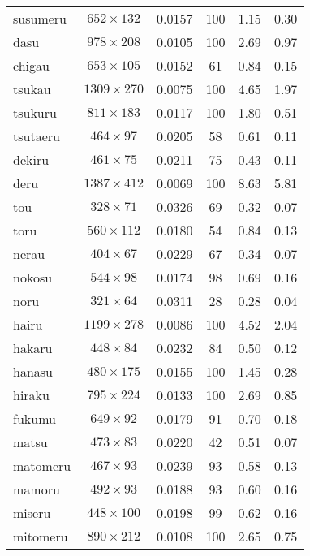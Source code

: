 \begin{table}[ht]
\begin{center}
\begin{tabular}{|p{}|c|c|c|c|c|}
susumeru & \( 652 \times 132 \) & 0.0157   &  100  & 1.15   & 0.30   \\
dasu & \( 978 \times 208 \) & 0.0105       &  100  & 2.69   & 0.97      \\
chigau & \( 653 \times 105 \) & 0.0152     &  61   & 0.84   & 0.15    \\
tsukau & \( 1309 \times 270 \) & 0.0075    &  100  & 4.65   & 1.97    \\
tsukuru & \( 811 \times 183 \) & 0.0117    &  100  & 1.80   & 0.51   \\
tsutaeru & \( 464 \times 97 \) & 0.0205    &  58   & 0.61   & 0.11   \\
dekiru & \( 461 \times 75 \) & 0.0211      &  75   & 0.43   & 0.11     \\
deru & \( 1387 \times 412 \) & 0.0069      &  100  & 8.63   & 5.81       \\
tou & \( 328 \times 71 \) & 0.0326         &  69   & 0.32   & 0.07        \\
toru & \( 560 \times 112 \) & 0.0180       &  54   & 0.84   & 0.13       \\
nerau & \( 404 \times 67 \) & 0.0229       &  67   & 0.34   & 0.07      \\
nokosu & \( 544 \times 98 \) & 0.0174      &  98   & 0.69   & 0.16     \\
noru & \( 321 \times 64 \) & 0.0311        &  28   & 0.28   & 0.04       \\
hairu & \( 1199 \times 278 \) & 0.0086     &  100  & 4.52   & 2.04      \\
hakaru & \( 448 \times 84 \) & 0.0232      &  84   & 0.50   & 0.12     \\
hanasu & \( 480 \times 175 \) & 0.0155     &  100  & 1.45   & 0.28     \\
hiraku & \( 795 \times 224 \) & 0.0133     &  100  & 2.69   & 0.85     \\
fukumu & \( 649 \times 92 \) & 0.0179      &  91   & 0.70   & 0.18     \\
matsu & \( 473 \times 83 \) & 0.0220       &  42   & 0.51   & 0.07      \\
matomeru & \( 467 \times 93 \) & 0.0239    &  93   & 0.58   & 0.13   \\
mamoru & \( 492 \times 93 \) & 0.0188      &  93   & 0.60   & 0.16     \\
miseru & \( 448 \times 100 \) & 0.0198     &  99   & 0.62   & 0.16     \\
mitomeru & \( 890 \times 212 \) & 0.0108   &  100  & 2.65   & 0.75   \\

\end{tabular}
\end{center}
\end{table}
